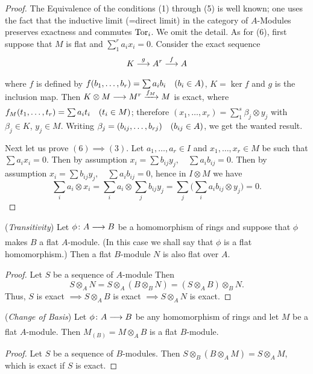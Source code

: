\documentclass[../main]{subfiles}
\begin{document}
\begin{proof}
    The Equivalence of the conditions (1) through (5) is well known; one uses the fact that the inductive limit (=direct limit) in the category of $A$-Modules preserves exactness and commutes $\operatorname{Tor}_i$. We omit the detail. As for (6), first suppose that $M$ is flat and $\sum_1^r a_i x_i = 0$. Consider the exact sequence
    \[
        K \varrightarrow{g} A^r \varrightarrow{f} A
    \]
    where $f$ is defined by $f(b_1,\ldots, b_r) = \sum a_i b_i\for{b_i \in A}$, $K = \ker{f}$ and $g$ is the inclusion map. Then $K\otimes M \varrightarrow{} M^r \varrightarrow{f_M} M$ is exact, where \newline $f_M(t_1,\ldots,t_r) = \sum a_i t_i\for{t_i \in M}$; therefore $(x_1,\ldots,x_r) = \sum_1^s \beta_j \otimes y_j$ with $\beta_j \in K$, $y_j \in M$. Writing $\beta_j = (b_{ij},\ldots,b_{rj})\for{b_{ij} \in A}$, we get the wanted result.
    
    Next let us prove $(6) \implies (3)$. Let $a_1,\ldots,a_r \in I$ and $x_1,\ldots,x_r \in M$ be such that $\sum a_ix_i =0$. Then by assumption $x_i = \sum b_{ij}y_j, \quad \sum a_ib_{ij} = 0$. Then by assumption $x_i=\sum b_{ij}y_j,\quad  \sum a_ib_{ij} =0$, hence in $I\otimes M$ we have \[\sum_i a_i \otimes x_i= \sum_i a_i \otimes \sum_j b_{ij}y_j= \sum_j \bigg( \sum_ia_ib_{ij} \otimes y_j \bigg) = 0.\]
\end{proof}
 
\newparagraph (\emph{Transitivity}) Let $\phi\colon A \varrightarrow{} B  $ be a homomorphism of rings and suppose that $\phi$ makes $B$ a flat $A$-module. (In this case we shall say that $\phi$ is a flat homomorphism.) Then a flat $B$-module $N$ is also flat over $A$.

\begin{proof} 
    Let $S$ be a sequence of $A$-module Then 
    \[
        S \otimes_A N = S \otimes_A (B \otimes_B N) = (S \otimes_A B) \otimes_B N.
    \] 
    Thus, $S$ is exact $\implies S \otimes_A B$ is exact $\implies S \otimes_A N$ is exact.
\end{proof}

\newparagraph (\emph{Change of Basis}) Let $\phi\colon A \varrightarrow{} B$ be any homomorphism of rings and let $M$ be a flat $A$-module. Then $M_{(B)} = M \otimes_A B$ is a flat $B$-module.

\begin{proof}
    Let $S$ be a sequence of $B$-modules. Then $S \otimes_B (B \otimes_A M) = S \otimes_AM$, which is exact if $S$ is exact.
\end{proof}
\end{document}
